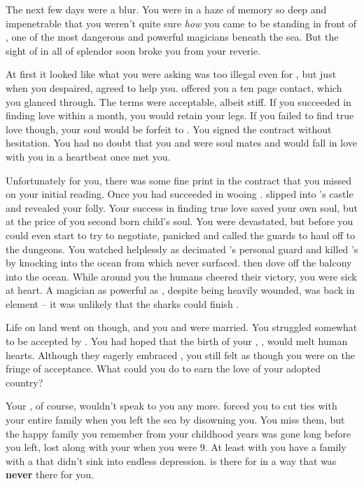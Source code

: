 \documentclass[char]{NeptuneBall}
\begin{document}
The next few days were a blur. You were in a haze of memory so deep and impenetrable that you weren't quite sure \emph{how} you came to be standing in front of \cWitch{}, one of the most dangerous and powerful magicians beneath the sea. But the sight of \cWitch{\them} in all of \cWitch{\their} splendor soon broke you from your reverie.

At first it looked like what you were asking was too illegal even for \cWitch{}, but just when you despaired, \cWitch{\they} agreed to help you. \cWitch{} offered you a ten page contact, which you glanced through. The terms were acceptable, albeit stiff. If you succeeded in finding love within a month, you would retain your legs. If you failed to find true love though, your soul would be forfeit to \cWitch{}. You signed the contract without hesitation. You had no doubt that you and \cEric{} were soul mates and \cEric{\they} would fall in love with you in a heartbeat once \cEric{} met you.

Unfortunately for you, there was some fine print in the contract that you missed on your initial reading. Once you had succeeded in wooing \cEric{}. \cWitch{} slipped into \cEric{}'s castle and revealed your folly. Your success in finding true love saved your own soul, but at the price of you second born child's soul. You were devastated, but before you could even start to try to negotiate, \cEric{} panicked and called the guards to haul \cWitch{} off to the dungeons. You watched helplessly as \cWitch{} decimated \cEric{}'s personal guard and killed \cEric{}'s \cSlave{\sibling} \cSlave{} by knocking \cSlave{\them} into the ocean from which \cSlave{\they} never surfaced. \cWitch{} then dove off the balcony into the ocean. While around you the humans cheered their victory, you were sick at heart. A magician as powerful as \cWitch{}, despite being heavily wounded, was back in \cWitch{\their} element -- it was unlikely that the sharks could finish \cWitch{\them}.

Life on land went on though, and you and \cEric{} were married. You struggled somewhat to be accepted by \pAmerica{}. You had hoped that the birth of your \cWillow{\offspring}, \cWillow{}, would melt human hearts. Although they eagerly embraced \cWillow{}, you still felt as though you were on the fringe of acceptance. What could you do to earn the love of your adopted country? 

Your \cKing{\parent}, of course, wouldn't speak to you any more. \cKing{\They} forced you to cut ties with your entire family when you left the sea by disowning you. You miss them, but the happy family you remember from your childhood years was gone long before you left, lost along with your \cAthena{\parent} when you were 9. At least with \cEric{} you have a family with a \cEric{\parent} that didn't sink into endless depression. \cEric{} is there for \cWillow{} in a way that \cKing{} was {\bf never} there for you.
\end{document}
